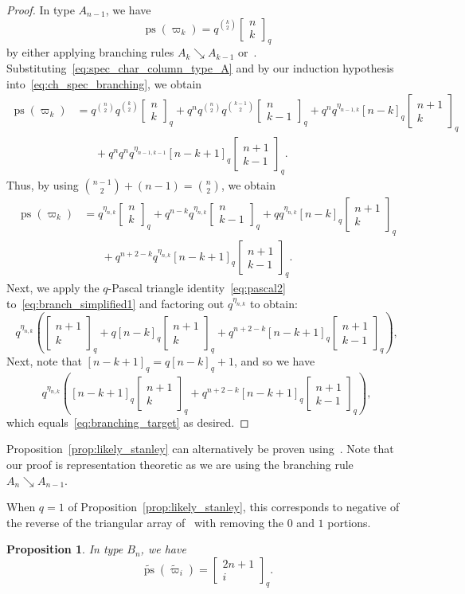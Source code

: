 \documentclass[11pt, leqno]{amsart}
\theoremstyle{plain}
\newtheorem{proposition}[theorem]{Proposition}
\theoremstyle{definition}
\numberwithin{equation}{section}
\newcommand{\fw}{\varpi} %
\newcommand{\tfw}{\widetilde{\fw}} %
\newcommand{\qbinom}[3]{\left[ \begin{matrix} #1 \\ #2 \end{matrix} \right]_{#3}} %
\newcommand{\ps}{\operatorname{ps}} %
\newcommand{\nps}{\widetilde{\ps}} %
\begin{document}
\begin{proof}
In type $A_{n-1}$, we have
\begin{equation}
\label{eq:spec_char_column_type_A}
\ps(\varpi_k) = q^{\binom{k}{2}} \qbinom{n}{k}{q}
\end{equation}
by either applying branching rules $A_k \searrow A_{k-1}$ or~\cite[Thm.~7.21.2]{ECII}.
Substituting~\eqref{eq:spec_char_column_type_A} and by our induction hypothesis into~\eqref{eq:ch_spec_branching}, we obtain
\begin{align*}
\ps(\varpi_k) & = q^{\binom{n}{2}} q^{\binom{k}{2}} \qbinom{n}{k}{q} + q^n q^{\binom{n}{2}} q^{\binom{k-1}{2}} \qbinom{n}{k-1}{q} + q^n  q^{\eta_{n-1,k}} [n-k]_q \qbinom{n+1}{k}{q}
\\ & \hspace{20pt} + q^n q^n  q^{\eta_{n-1,k-1}} [n-k+1]_q \qbinom{n+1}{k-1}{q}.
\end{align*}
Thus, by using $\binom{n-1}{2} + (n-1) = \binom{n}{2}$, we obtain
\begin{equation}
\label{eq:branch_simplified1}
\begin{aligned}
\ps(\varpi_k) & =q^{\eta_{n,k}} \qbinom{n}{k}{q} + q^{n-k} q^{\eta_{n,k}} \qbinom{n}{k-1}{q} + q q^{\eta_{n,k}}[n-k]_q \qbinom{n+1}{k}{q}
\\ & \hspace{20pt} + q^{n+2-k} q^{\eta_{n,k}} [n-k+1]_q \qbinom{n+1}{k-1}{q}.
\end{aligned}
\end{equation}
Next, we apply the $q$-Pascal triangle identity~\eqref{eq:pascal2} to~\eqref{eq:branch_simplified1} and factoring out $q^{\eta_{n,k}}$ to obtain:
\[
q^{\eta_{n,k}} \left( \qbinom{n+1}{k}{q} + q [n-k]_q \qbinom{n+1}{k}{q} + q^{n+2-k}  [n-k+1]_q \qbinom{n+1}{k-1}{q} \right),
\]
Next, note that $[n-k+1]_q = q [n-k]_q + 1$, and so we have
\[
q^{\eta_{n,k}} \left( [n-k+1]_q \qbinom{n+1}{k}{q} + q^{n+2-k}  [n-k+1]_q \qbinom{n+1}{k-1}{q} \right),
\]
which equals~\eqref{eq:branching_target} as desired.
\end{proof}

Proposition~\ref{prop:likely_stanley} can alternatively be proven using~\cite[Thm.~7.21.2]{ECII}. Note that our proof is representation theoretic as we are using the branching rule $A_n \searrow A_{n-1}$.

When $q=1$ of Proposition~\ref{prop:likely_stanley}, this corresponds to negative of the reverse of the triangular array of~\cite[A055137]{OEIS} with removing the $0$ and $1$ portions.

\begin{proposition}
\label{prop:q_binomial_repr}
In type $B_n$, we have
\[
\nps(\tfw_i) = \qbinom{2n+1}{i}{q}.
\]
\end{proposition}
\end{document}
